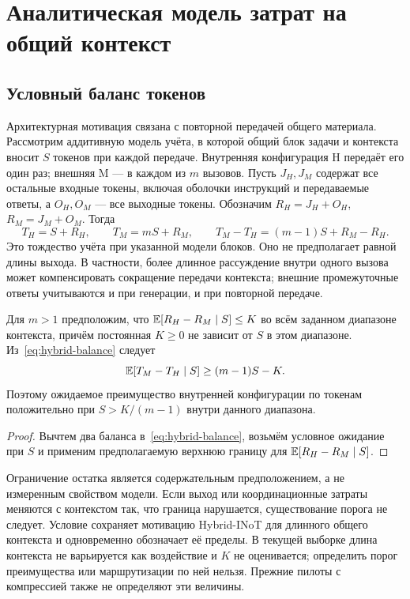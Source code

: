 \section{Аналитическая модель затрат на общий контекст}
\label{sec:hybrid-accounting}

\subsection{Условный баланс токенов}
Архитектурная мотивация связана с повторной передачей общего материала. Рассмотрим аддитивную модель учёта, в которой общий блок задачи и контекста вносит $S$ токенов при каждой передаче. Внутренняя конфигурация H передаёт его один раз; внешняя M --- в каждом из $m$ вызовов. Пусть $J_H,J_M$ содержат все остальные входные токены, включая оболочки инструкций и передаваемые ответы, а $O_H,O_M$ --- все выходные токены. Обозначим $R_H=J_H+O_H$, $R_M=J_M+O_M$. Тогда
\begin{equation}
T_H=S+R_H,\qquad T_M=mS+R_M,
\qquad T_M-T_H=(m-1)S+R_M-R_H.
\label{eq:hybrid-balance}
\end{equation}
Это тождество учёта при указанной модели блоков. Оно не предполагает равной длины выхода. В частности, более длинное рассуждение внутри одного вызова может компенсировать сокращение передачи контекста; внешние промежуточные ответы учитываются и при генерации, и при повторной передаче.

\begin{proposition}
\label{prop:hybrid-bound}
Для $m>1$ предположим, что $\mathbb{E}[R_H-R_M\mid S]\le K$ во всём заданном диапазоне контекста, причём постоянная $K\ge0$ не зависит от $S$ в этом диапазоне. Из~\eqref{eq:hybrid-balance} следует
\[
\mathbb{E}[T_M-T_H\mid S]\ge(m-1)S-K.
\]
Поэтому ожидаемое преимущество внутренней конфигурации по токенам положительно при $S>K/(m-1)$ внутри данного диапазона.
\end{proposition}
\begin{proof}
Вычтем два баланса в~\eqref{eq:hybrid-balance}, возьмём условное ожидание при $S$ и применим предполагаемую верхнюю границу для $\mathbb{E}[R_H-R_M\mid S]$.
\end{proof}

Ограничение остатка является содержательным предположением, а не измеренным свойством модели. Если выход или координационные затраты меняются с контекстом так, что граница нарушается, существование порога не следует. Условие сохраняет мотивацию Hybrid-INoT для длинного общего контекста и одновременно обозначает её пределы. В текущей выборке длина контекста не варьируется как воздействие и $K$ не оценивается; определить порог преимущества или маршрутизации по ней нельзя. Прежние пилоты с компрессией также не определяют эти величины.

